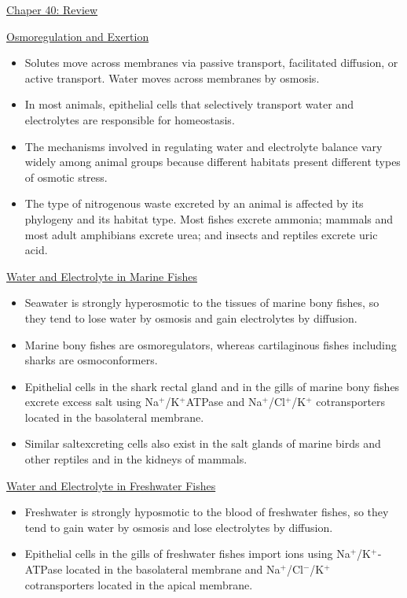 \documentclass[12pt,letterpaper]{article}
\begin{document}
\hypertarget{40.r}{}
    \begin{probbox}{\hyperlink{40}{Chaper 40: Review}}\end{probbox}
        \hyperlink{40.1}{Osmoregulation and Exertion}
        \begin{itemize}
            \item Solutes move across membranes via passive transport, facilitated diffusion, or active transport. Water moves across membranes by osmosis. 
            \item In most animals, epithelial cells that selectively transport water and electrolytes are responsible for homeostasis. 
            \item The mechanisms involved in regulating water and electrolyte balance vary widely among animal groups because different habitats present different types of osmotic stress.
            \item The type of nitrogenous waste excreted by an animal is affected by its phylogeny and its habitat type. Most fishes excrete ammonia; mammals and most adult amphibians excrete urea; and insects and reptiles excrete uric acid.
        \end{itemize}
        \hyperlink{40.2}{Water and Electrolyte in Marine Fishes}
        \begin{itemize}
            \item Seawater is strongly hyperosmotic to the tissues of marine bony fishes, so they tend to lose water by osmosis and gain electrolytes by diffusion. 
            \item Marine bony fishes are osmoregulators, whereas cartilaginous fishes including sharks are osmoconformers. 
            \item Epithelial cells in the shark rectal gland and in the gills of marine bony fishes excrete excess salt using Na\(^+\)/K\(^+\)­ATPase and Na\(^+\)/Cl\(^+\)/K\(^+\) cotransporters located in the basolateral membrane. 
            \item Similar salt­excreting cells also exist in the salt glands of marine birds and other reptiles and in the kidneys of mammals.
        \end{itemize}
        \hyperlink{40.3}{Water and Electrolyte in Freshwater Fishes}
        \begin{itemize}
            \item Freshwater is strongly hyposmotic to the blood of freshwater fishes, so they tend to gain water by osmosis and lose electrolytes by diffusion. 
            \item Epithelial cells in the gills of freshwater fishes import ions using Na\(^+\)/K\(^+\)­ATPase located in the basolateral membrane and Na\(^+\)/Cl\(^-\)/K\(^+\) cotransporters located in the apical membrane.
        \end{itemize}
\end{document}
